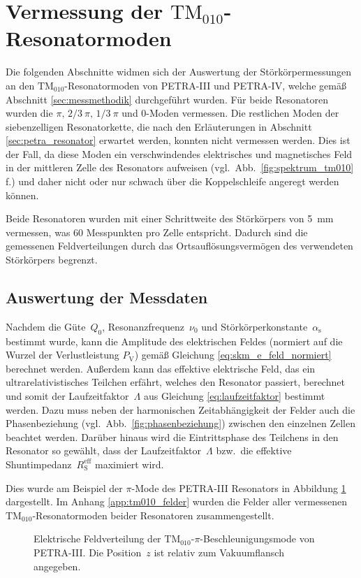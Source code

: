 \section{Vermessung der $\mathrm{TM}_{010}$-Resonatormoden}
\label{sec:tm010_messung}
Die folgenden Abschnitte widmen sich der Auswertung der Störkörpermessungen an den $\mathrm{TM}_{010}$-Resonatormoden von PETRA-III und PETRA-IV, welche gemäß Abschnitt \ref{sec:messmethodik} durchgeführt wurden.
Für beide Resonatoren wurden die $\pi,\, 2/3~\pi, \, 1/3~\pi$ und $0$-Moden vermessen.
Die restlichen Moden der siebenzelligen Resonatorkette, die nach den Erläuterungen in Abschnitt \ref{sec:petra_resonator} erwartet werden, konnten nicht vermessen werden.
Dies ist der Fall, da diese Moden ein verschwindendes elektrisches und magnetisches Feld in der mittleren Zelle des Resonators aufweisen (vgl.\ Abb.\ \ref{fig:spektrum_tm010} f.) und daher nicht oder nur schwach über die Koppelschleife angeregt werden können.

Beide Resonatoren wurden mit einer Schrittweite des Störkörpers von \SI{5}{mm} vermessen, was \num{60} Messpunkten pro Zelle entspricht.
Dadurch sind die gemessenen Feldverteilungen durch das Ortsauflösungsvermögen des verwendeten Störkörpers begrenzt.

\subsection{Auswertung der Messdaten}
Nachdem die Güte~$Q_0$, Resonanzfrequenz~$\nu_0$ und Störkörperkonstante~$\alpha_\mathrm{s}$ bestimmt wurde, kann die Amplitude des elektrischen Feldes (normiert auf die Wurzel der Verlustleistung $P_\mathrm{V}$) gemäß Gleichung \eqref{eq:skm_e_feld_normiert} berechnet werden.
Außerdem kann das effektive elektrische Feld, das ein ultrarelativistisches Teilchen erfährt, welches den Resonator passiert, berechnet und somit der Laufzeitfaktor~$\Lambda$ aus Gleichung \eqref{eq:laufzeitfaktor} bestimmt werden.
Dazu muss neben der harmonischen Zeitabhängigkeit der Felder auch die Phasenbeziehung (vgl.\ Abb.\ \ref{fig:phasenbeziehung}) zwischen den einzelnen Zellen beachtet werden.
Darüber hinaus wird die Eintrittsphase des Teilchens in den Resonator so gewählt, dass der Laufzeitfaktor~$\Lambda$ bzw.\ die effektive Shuntimpedanz~$R_\mathrm{S}^\mathrm{eff}$ maximiert wird.

Dies wurde am Beispiel der $\pi$-Mode des PETRA-III Resonators in Abbildung \ref{fig:bsp_feld_tm010pi_petra3} dargestellt.
Im Anhang \ref{app:tm010_felder} wurden die Felder aller vermessenen $\mathrm{TM}_{010}$-Resonatormoden beider Resonatoren zusammengestellt.  
\begin{figure}[h]
	\centering
	
	\caption[Elektrische Feldverteilung der $\mathrm{TM}_{010}\text{-}\pi$-Beschleunigungsmode von PETRA-III]{Elektrische Feldverteilung der $\mathrm{TM}_{010}\text{-}\pi$-Beschleunigungsmode von PETRA-III. Die Position~$z$ ist relativ zum Vakuumflansch angegeben.}
	\label{fig:bsp_feld_tm010pi_petra3}
\end{figure}

